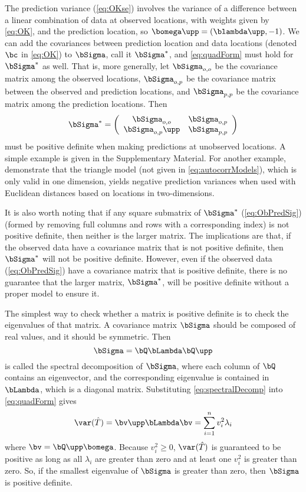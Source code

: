 The prediction variance (\ref{eq:OKse}) involves the variance of a difference between a linear combination of data at observed locations, with weights given by \ref{eq:OK}, and the prediction location, so $\bomega\upp = (\blambda\upp,-1)$. We can add the covariances between prediction location and data locations (denoted $\bc$ in \ref{eq:OK}) to $\bSigma$, call it $\bSigma^*$, and \ref{eq:quadForm} must hold for $\bSigma^*$ as well. That is, more generally, let $\bSigma_{o,o}$ be the covariance matrix among the observed locations, $\bSigma_{o,p}$ be the covariance matrix between the observed and prediction locations, and $\bSigma_{p,p}$  be the covariance matrix among the prediction locations. Then
\begin{equation} \label{eq:ObPredSig}
				\bSigma^* = \left(
					\begin{array}{cc}
									\bSigma_{o,o} & \bSigma_{o,p} \\
									\bSigma_{o,p}\upp & \bSigma_{p,p}
					\end{array}
				\right)
\end{equation}
must be positive definite when making predictions at unobserved locations. A simple example is given in the Supplementary Material. For another example, \citet{Guil:Schi:Porc:Bevi:vali:2014} demonstrate that the triangle model (not given in \ref{eq:autocorrModels}), which is only valid in one dimension, yields negative prediction variances when used with Euclidean distances based on locations in two-dimensions.  

It is also worth noting that if any square submatrix of $\bSigma^*$ (\ref{eq:ObPredSig}) (formed by removing full columns and rows with a corresponding index) is not positive definite, then neither is the larger matrix.  The implications are that, if the observed data have a covariance matrix that is not positive definite, then $\bSigma^*$ will not be positive definite.  However, even if the observed data (\ref{eq:ObPredSig}) have a covariance matrix that is positive definite, there is no guarantee that the larger matrix, $\bSigma^*$, will be positive definite without a proper model to ensure it.

The simplest way to check whether a matrix is positive definite is to check the eigenvalues of that matrix.  A covariance matrix $\bSigma$ should be composed of real values, and it should be symmetric.  Then 
\begin{equation} \label{eq:spectralDecomp}
  \bSigma = \bQ\bLambda\bQ\upp
\end{equation}
is called the spectral decomposition of $\bSigma$, where each column of $\bQ$ contains an eigenvector, and the corresponding eigenvalue is contained in $\bLambda$, which is a diagonal matrix.  Substituting \ref{eq:spectralDecomp} into \ref{eq:quadForm} gives
\[
\var(\hat{T}) = \bv\upp\bLambda\bv = \sum_{i=1}^n v_i^2\lambda_i
\]
where $\bv = \bQ\upp\bomega$. Because $v_i^2 \ge 0$, $\var(\hat{T})$ is guaranteed to be positive as long as all $\lambda_i$ are greater than zero and at least one $v_i^2$ is greater than zero.  So, if the smallest eigenvalue of $\bSigma$ is greater than zero, then $\bSigma$ is positive definite.

